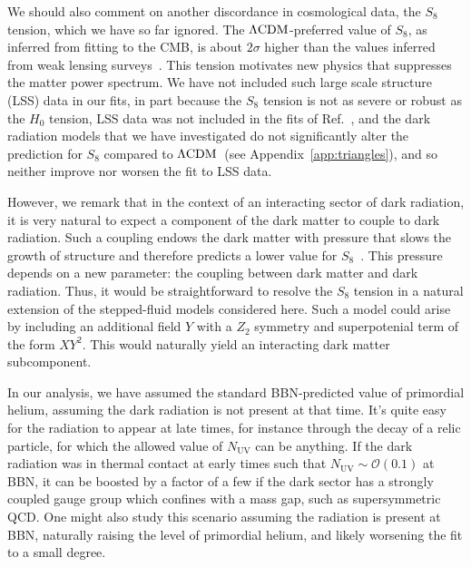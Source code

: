 \documentclass[aps,prd,twocolumn,nofootinbib,superscriptaddress]{revtex4}
\newcommand{\order}[1]{\mathcal{O}{(#1)}}
\newcommand{\App}[1]{Appendix~\ref{app:#1}}
\newcommand{\nuv}{N_\text{UV}}
\def\lcdm{$\Lambda{\rm CDM}$}
\begin{document}
We should also comment on another discordance in cosmological data, the $S_8$ tension, which we have so far ignored. The \lcdm-preferred value of $S_8$, as  inferred from fitting to the CMB, is about $2\sigma$ higher than the values inferred from weak lensing surveys~\cite{Hildebrandt:2016iqg,Hildebrandt:2018yau,DES:2017myr,HSC:2018mrq}. This tension motivates new physics that suppresses the matter power spectrum. We have not included such large scale structure (LSS) data in our fits, in part because the $S_8$ tension is not as severe or robust as the $H_0$ tension,  LSS data was not included in the fits of Ref.~\cite{Schoneberg:2021qvd}, and the dark radiation models that we have investigated do not significantly alter the prediction for $S_8$ compared to \lcdm\  (see \App{triangles}), and so neither improve nor worsen the fit to LSS data.

However, we remark that in the context of an interacting sector of dark radiation, it is very natural to expect a component of the dark matter to couple to dark radiation. Such a coupling endows the dark matter with pressure that slows the growth of structure and therefore predicts a lower value for $S_8$~\cite{Buen-Abad:2015ova,Lesgourgues:2015wza,Buen-Abad:2017gxg,Bansal:2021dfh}. This pressure depends on a new parameter: the coupling between dark matter and dark radiation. Thus, it would be straightforward to resolve the $S_8$ tension in a natural extension of the stepped-fluid models considered here.  Such a model could arise by including an additional field $Y$ with a $Z_2$ symmetry and superpotenial term of the form 
$X Y^2$. This would naturally yield an interacting dark matter subcomponent. 

In our analysis, we have assumed the standard BBN-predicted value of primordial helium, assuming the dark radiation is not present at that time. It's quite easy for the radiation to appear at late times, for instance through the decay of a relic particle, for which the allowed value of $\nuv$ can be anything. If the dark radiation was in thermal contact at early times such that $\nuv \sim \order{0.1}$ at BBN, it can be boosted by a factor of a few if the dark sector has  a strongly coupled gauge group which confines with a mass gap, such as supersymmetric QCD. One might also study this scenario assuming the radiation is present at BBN, naturally raising the level of primordial helium, and likely worsening the fit to a small degree. 
\end{document}
